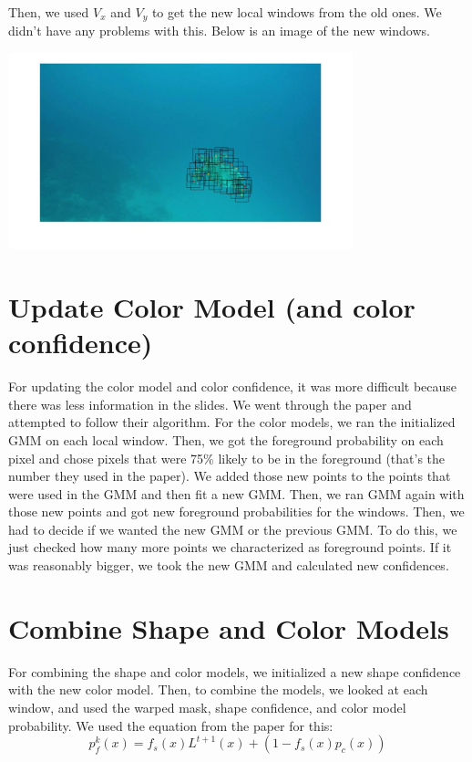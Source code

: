 \documentclass{article}
\begin{document}
	Then, we used $V_x$ and $V_y$ to get the new local windows from the old ones. We didn’t have any problems with this. Below is an image of the new windows.
	
	\begin{center}
		\includegraphics[width=100mm]{img/i10}
	\end{center}

	\section{Update Color Model (and color confidence)}
	For updating the color model and color confidence, it was more difficult because there was less information in the slides. We went through the paper and attempted to follow their algorithm. For the color models, we ran the initialized GMM on each local window. Then, we got the foreground probability on each pixel and chose pixels that were 75\% likely to be in the foreground (that’s the number they used in the paper). We added those new points to the points that were used in the GMM and then fit a new GMM. Then, we ran GMM again with those new points and got new foreground probabilities for the windows.
	Then, we had to decide if we wanted the new GMM or the previous GMM. To do this, we just checked how many more points we characterized as foreground points. If it was reasonably bigger, we took the new GMM and calculated new confidences. 
	
	\section{Combine Shape and Color Models}
	For combining the shape and color models, we initialized a new shape confidence with the new color model. Then, to combine the models, we looked at each window, and used the warped mask, shape confidence, and color model probability. We used the equation from the paper for this: $$p_f^k(x)=f_s(x)L^{t+1}(x)+(1-f_s(x)p_c(x))$$
	
\end{document}
